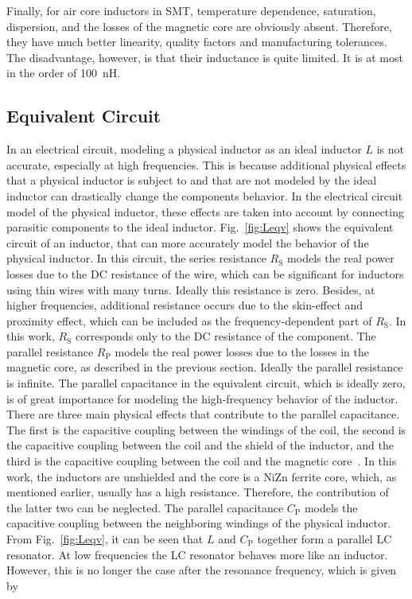 Finally, for air core inductors in SMT, temperature dependence, saturation, dispersion, and the losses of the magnetic core are obviously absent. Therefore, they have much better linearity, quality factors and manufacturing tolerances. The disadvantage, however, is that their inductance is quite limited. It is at most in the order of \SI{100}{\nano\henry}.

\subsection{Equivalent Circuit}
In an electrical circuit, modeling a physical inductor as an ideal inductor $L$ is not accurate, especially at high frequencies. This is because additional physical effects that a physical inductor is subject to and that are not modeled by the ideal inductor can drastically change the components behavior. In the electrical circuit model of the physical inductor, these effects are taken into account by connecting parasitic components to the ideal inductor. Fig.~\ref{fig:Leqv} shows the equivalent circuit of an inductor, that can more accurately model the behavior of the physical inductor. In this circuit, the series resistance $R_\mathrm{S}$ models the real power losses due to the DC resistance of the wire, which can be significant for inductors using thin wires with many turns. Ideally this resistance is zero. Besides, at higher frequencies, additional resistance occurs due to the skin-effect and proximity effect, which can be included as the frequency-dependent part of $R_{\mathrm{S}}$. In this work, $R_{\mathrm{S}}$ corresponds only to the DC resistance of the component. The parallel resistance $R_{\mathrm{P}}$ models the real power losses due to the losses in the magnetic core, as described in the previous section. Ideally the parallel resistance is infinite. The parallel capacitance in the equivalent circuit, which is ideally zero, is of great importance for modeling the high-frequency behavior of the inductor. There are three main physical effects that contribute to the parallel capacitance. The first is the capacitive coupling between the windings of the coil, the second is the capacitive coupling between the coil and the shield of the inductor, and the third is the capacitive coupling between the coil and the magnetic core~\cite{6732932}. In this work, the inductors are unshielded and the core is a NiZn ferrite core, which, as mentioned earlier, usually has a high resistance. Therefore, the contribution of the latter two can be neglected. The parallel capacitance $C_\mathrm{P}$ models the capacitive coupling between the neighboring windings of the physical inductor. From Fig.~\ref{fig:Leqv}, it can be seen that $L$ and $C_{\mathrm{P}}$ together form a parallel LC resonator. At low frequencies the LC resonator behaves more like an inductor. However, this is no longer the case after the resonance frequency, which is given by
